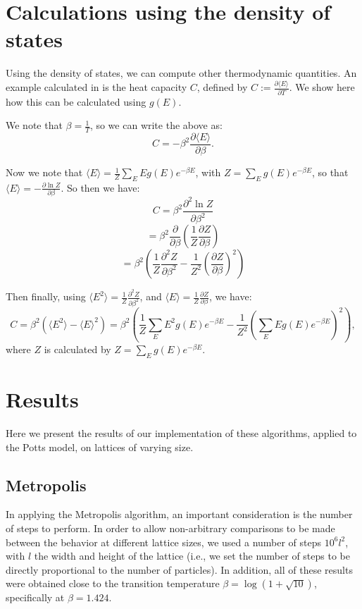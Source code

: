 \documentclass{article}
\begin{document}
\section{Calculations using the density of states}
\label{sec:calculations}
Using the density of states, we can compute other thermodynamic quantities.
An example calculated in \cite{WangLandau} is the heat capacity $C$, defined by $C := \frac{\partial\langle E\rangle}{\partial T}$.
We show here how this can be calculated using $g(E)$.

We note that $\beta = \frac{1}{T}$, so we can write the above as:
$$ C = -\beta^2\frac{\partial\langle E\rangle}{\partial\beta}. $$

Now we note that $\langle E\rangle = \frac{1}{Z}\sum_E Eg(E)e^{-\beta E}$, with $Z = \sum_E g(E)e^{-\beta E}$, so that $\langle E\rangle = -\frac{\partial \ln Z}{\partial\beta}$.
So then we have:
$$ C = \beta^2\frac{\partial^2 \ln Z}{\partial\beta^2} $$
$$ = \beta^2\frac{\partial}{\partial\beta}\left(\frac{1}{Z}\frac{\partial Z}{\partial\beta}\right) $$
$$ = \beta^2\left(\frac{1}{Z}\frac{\partial^2 Z}{\partial\beta^2} - \frac{1}{Z^2}\left(\frac{\partial Z}{\partial\beta}\right)^2\right) $$

Then finally, using $\langle E^2\rangle = \frac{1}{Z}\frac{\partial^2 Z}{\partial\beta^2}$, and $\langle E\rangle = \frac{1}{Z}\frac{\partial Z}{\partial\beta}$, we have:
$$ C = \beta^2(\langle E^2 \rangle - \langle E \rangle^2) = \beta^2(\frac{1}{Z}\sum_E E^2g(E)e^{-\beta E} - \frac{1}{Z^2}(\sum_E Eg(E)e^{-\beta E})^2), $$
where $Z$ is calculated by $Z = \sum_E g(E)e^{-\beta E}$.

\section{Results}
Here we present the results of our implementation of these algorithms, applied to the Potts model, on lattices of varying size.

\subsection{Metropolis}
\label{sec:metropolis}
In applying the Metropolis algorithm, an important consideration is the number of steps to perform.
In order to allow non-arbitrary comparisons to be made between the behavior at different lattice sizes, we used a number of steps $10^6l^2$, with $l$ the width and height of the lattice (i.e., we set the number of steps to be directly proportional to the number of particles).
In addition, all of these results were obtained close to the transition temperature $\beta = \log(1+\sqrt{10})$, specifically at $\beta = 1.424$.
\end{document}

